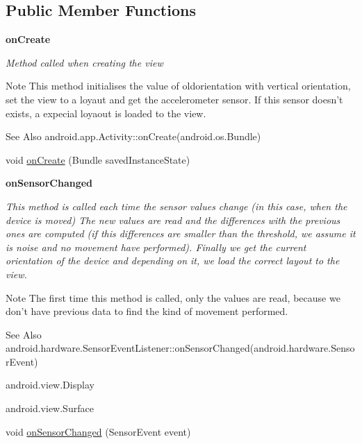 \subsection*{Public Member Functions}
\begin{Indent}{\bf on\-Create}\par
{\em Method called when creating the view

\begin{DoxyNote}{Note}
This method initialises the value of oldorientation with vertical orientation, set the view to a loyaut and get the accelerometer sensor. If this sensor doesn't exists, a expecial loyaout is loaded to the view.
\end{DoxyNote}
\begin{DoxySeeAlso}{See Also}
android.\-app.\-Activity\-::on\-Create(android.\-os.\-Bundle) 
\end{DoxySeeAlso}
}\begin{DoxyCompactItemize}
\item 
void \hyperlink{classnpi_1_1practicaandroid_1_1tutorialnpi_1_1_accelerometer_a1bd1579a7cc755bf33a452662a7fe554}{on\-Create} (Bundle saved\-Instance\-State)
\end{DoxyCompactItemize}
\end{Indent}
\begin{Indent}{\bf on\-Sensor\-Changed}\par
{\em This method is called each time the sensor values change (in this case, when the device is moved) The new values are read and the differences with the previous ones are computed (if this differences are smaller than the threshold, we assume it is noise and no movement have performed). Finally we get the current orientation of the device and depending on it, we load the correct layout to the view.

\begin{DoxyNote}{Note}
The first time this method is called, only the values are read, because we don't have previous data to find the kind of movement performed.
\end{DoxyNote}
\begin{DoxySeeAlso}{See Also}
android.\-hardware.\-Sensor\-Event\-Listener\-::on\-Sensor\-Changed(android.\-hardware.\-Sensor\-Event) 

android.\-view.\-Display 

android.\-view.\-Surface 
\end{DoxySeeAlso}
}\begin{DoxyCompactItemize}
\item 
void \hyperlink{classnpi_1_1practicaandroid_1_1tutorialnpi_1_1_accelerometer_a5636ff2ca0fa8c815803700980f90fc7}{on\-Sensor\-Changed} (Sensor\-Event event)
\end{DoxyCompactItemize}
\end{Indent}

